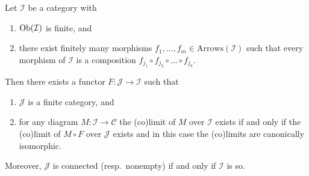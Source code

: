 \begin{lemma}
\label{lemma-finite-diagram-category}
Let $\mathcal{I}$ be a category with
\begin{enumerate}
\item $\mathop{\mathrm{Ob}}\nolimits(\mathcal{I})$ is finite, and
\item there exist finitely many morphisms
$f_1, \ldots, f_m \in \text{Arrows}(\mathcal{I})$ such
that every morphism of $\mathcal{I}$ is a composition
$f_{j_1} \circ f_{j_2} \circ \ldots \circ f_{j_k}$.
\end{enumerate}
Then there exists a functor $F : \mathcal{J} \to \mathcal{I}$
such that
\begin{enumerate}
\item[(a)] $\mathcal{J}$ is a finite category, and
\item[(b)] for any diagram $M : \mathcal{I} \to \mathcal{C}$ the
(co)limit of $M$ over $\mathcal{I}$ exists if and only if
the (co)limit of $M \circ F$ over $\mathcal{J}$ exists and in this case
the (co)limits are canonically isomorphic.
\end{enumerate}
Moreover, $\mathcal{J}$ is connected (resp.\ nonempty) if and only if
$\mathcal{I}$ is so.
\end{lemma}


